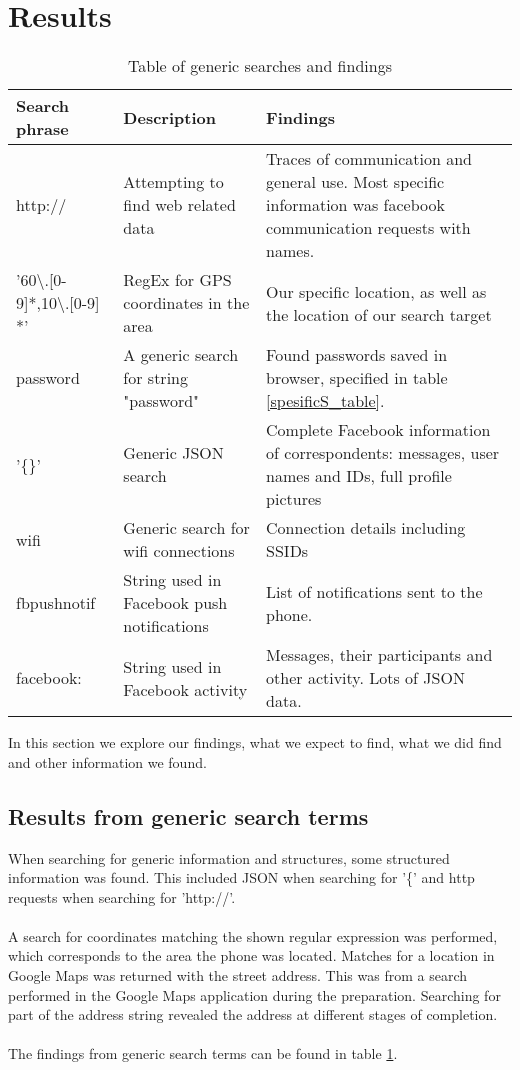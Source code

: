 \section{Results}
\begin{table}[!ht]
\centering
\begin{tabular}{|m{1.8cm}|m{2.5cm}|m{3cm}|}
\hline
Search phrase & Description & Findings \\
\hline
http:// & Attempting to find web related data  & Traces of communication and general use. Most specific information was facebook communication requests with names. \\
\hline
'60\textbackslash.[0-9]*,10\textbackslash.[0-9] *' &  RegEx for GPS coordinates in the area & Our specific location, as well as the location of our search target \\
\hline
password & A generic search for string "password" & Found passwords saved in browser, specified in table \ref{spesificS_table}. \\
\hline
'\{\}' & Generic JSON search & Complete Facebook information of correspondents: messages, user names and IDs, full profile pictures\\
\hline  
wifi & Generic search for wifi connections & Connection details including SSIDs \\  
\hline
fbpushnotif & String used in Facebook push notifications & List of notifications sent to the phone.\\
\hline
facebook: & String used in Facebook activity & Messages, their participants and other activity. Lots of JSON data.\\
\hline
\end{tabular}
\caption{Table of generic searches and findings}
\label{genericS_table}
\end{table}

In this section we explore our findings, what we expect to find, what we did find and other information we found. 

\subsection{Results from generic search terms}
When searching for generic information and structures, some structured information was found. This included JSON when searching for '\{' and http requests when searching for 'http://'.\\\\
A search for coordinates matching the shown regular expression was performed, which corresponds to the area the phone was located. Matches for a location in Google Maps was returned with the street address. This was from a search performed in the Google Maps application during the preparation. Searching for part of the address string revealed the address at different stages of completion.\\\\
The findings from generic search terms can be found in table \ref{genericS_table}.

